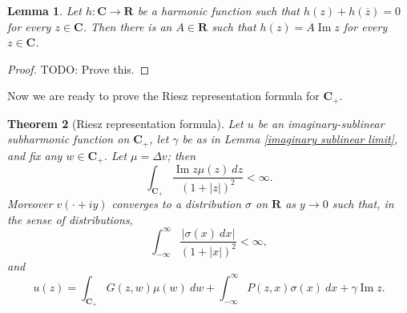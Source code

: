 \documentclass[12pt]{report}
\newcommand{\RR}{\mathbf{R}}
\newcommand{\CC}{\mathbf{C}}
\renewcommand{\Im}{\operatorname{Im}}
\newtheorem{theorem}{Theorem}[chapter]
\newtheorem{lemma}[theorem]{Lemma}
\theoremstyle{definition}
\theoremstyle{remark}
\begin{document}
\begin{lemma}
\label{reflected harmonics are linear}
Let $h: \CC \to \RR$ be a harmonic function such that $h(z) + h(\overline z) = 0$ for every $z \in \CC$. Then there is an $A \in \RR$ such that $h(z) = A \Im z$ for every $z \in \CC$.
\end{lemma}
\begin{proof}
TODO: Prove this.
\end{proof}

Now we are ready to prove the Riesz representation formula for $\CC_+$.
\begin{theorem}[Riesz representation formula]
    Let $u$ be an imaginary-sublinear subharmonic function on $\CC_+$, let $\gamma$ be as in Lemma \ref{imaginary sublinear limit}, and fix any $w \in \CC_+$. Let $\mu = \Delta v$; then
    \begin{equation}\label{estimate on mu}\int_{\CC_+} \frac{\Im z \mu(z) ~dz}{(1 + |z|)^2} < \infty.\end{equation}
    Moreover $v(\cdot + iy)$ converges to a distribution $\sigma$ on $\RR$ as $y \to 0$ such that, in the sense of distributions,
\begin{equation}\label{estimate on sigma}\int_{-\infty}^\infty \frac{|\sigma(x) ~dx|}{(1 + |x|)^2} < \infty,\end{equation}
    and
\begin{equation}\label{riesz formula}u(z) = \int_{\CC_+} G(z, w) \mu(w) ~dw + \int_{-\infty}^\infty P(z, x) \sigma(x) ~dx + \gamma \Im z.\end{equation}
\end{theorem}
\end{document}
